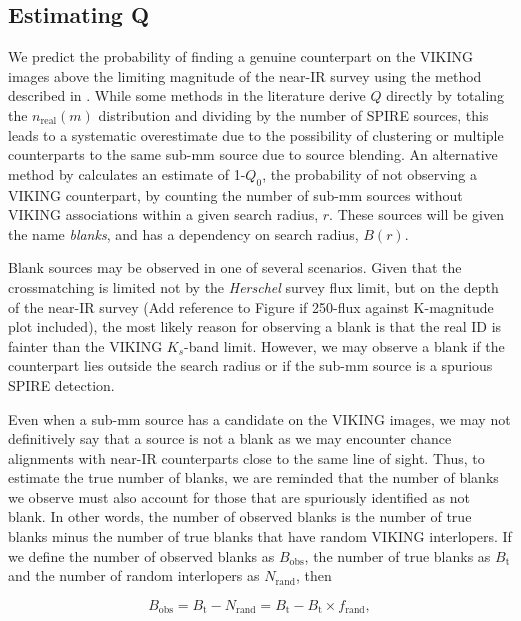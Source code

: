 \subsection{Estimating Q}

We predict the probability of finding a genuine counterpart on the VIKING images above the limiting magnitude of the near-IR survey using the method described in \citealt{Fleuren_2012}. While some methods in the literature derive $Q$ directly by totaling the $n_{\textrm{real}}(m)$ distribution and dividing by the number of SPIRE sources, this leads to a systematic overestimate due to the possibility of clustering or multiple counterparts to the same sub-mm source due to source blending. An alternative method by \citealt{Fleuren_2012} calculates an estimate of 1-$Q_0$, the probability of not observing a VIKING counterpart, by counting the number of sub-mm sources without VIKING associations within a given search radius, $r$. These sources will be given the name \textit{blanks}, and has a dependency on search radius, $B(r)$.

Blank sources may be observed in one of several scenarios. Given that the crossmatching is limited not by the \textit{Herschel} survey flux limit, but on the depth of the near-IR survey {\color{red} (Add reference to Figure if 250-flux against K-magnitude plot included)}, the most likely reason for observing a blank is that the real ID is fainter than the VIKING $K_s$-band limit. However, we may observe a blank if the counterpart lies outside the search radius or if the sub-mm source is a spurious SPIRE detection.

Even when a sub-mm source has a candidate on the VIKING images, we may not definitively say that a source is not a blank as we may encounter chance alignments with near-IR counterparts close to the same line of sight. Thus, to estimate the true number of blanks, we are reminded that the number of blanks we observe must also account for those that are spuriously identified as not blank. In other words, the number of observed blanks is the number of true blanks minus the number of true blanks that have random VIKING interlopers. If we define the number of observed blanks as $B_{\textrm{obs}}$, the number of true blanks as $B_{\textrm{t}}$ and the number of random interlopers as $N_{\textrm{rand}}$, then

\begin{equation}
    B_{\textrm{obs}} = B_{\textrm{t}} - N_{\textrm{rand}} = B_{\textrm{t}} - B_{\textrm{t}} \times f_{\textrm{rand}},
\end{equation}

